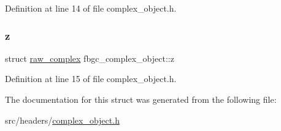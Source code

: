 Definition at line 14 of file complex\+\_\+object.\+h.

\mbox{\label{structfbgc__complex__object_a218f991fda9b8e5e9a9f97db4e588793}} 
\subsubsection{\texorpdfstring{z}{z}}
{\footnotesize\ttfamily struct \hyperlink{structraw__complex}{raw\+\_\+complex} fbgc\+\_\+complex\+\_\+object\+::z}



Definition at line 15 of file complex\+\_\+object.\+h.



The documentation for this struct was generated from the following file\+:\begin{DoxyCompactItemize}
\item 
src/headers/\hyperlink{complex__object_8h}{complex\+\_\+object.\+h}\end{DoxyCompactItemize}
